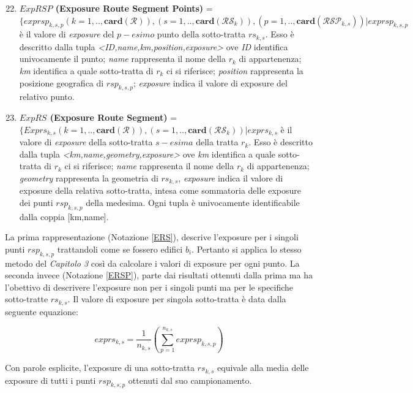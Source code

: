 \begin{enumerate}
\setcounter{enumi}{21}
\item \label{ERSP} \textbf{$ExpRSP$ (Exposure Route Segment Points)} =\\
$ \{exprsp_{k,s,p} (k=1,..,\mathbf{card}(\mathcal{R})),(s=1,..,\mathbf{card}(\mathcal{RS}_k)),(p=1,..,\mathbf{card}(\mathcal{RSP}_{k,s}))  | exprsp_{k,s,p} $ è il valore di \textit{exposure} del $p-esimo$ punto della sotto-tratta $rs_{k,s}$. Esso è descritto dalla tupla \textit{<ID,name,km,position,exposure>} ove \textit{ID} identifica univocamente il punto; \textit{name} rappresenta il nome della $r_k$ di appartenenza; \textit{km} identifica a quale sotto-tratta di $r_k$ ci si riferisce; \textit{position} rappresenta la posizione geografica di $rsp_{k,s,p}$; \textit{exposure} indica il valore di exposure del relativo punto.

\item \label{ERS} \textbf{$ExpRS$ (Exposure Route Segment)} =\\$ \{Exprs_{k,s} (k=1,..,\mathbf{card}(\mathcal{R})),(s=1,..,\mathbf{card}(\mathcal{RS}_k)) | exprs_{k,s} $ è il valore di \textit{exposure} della sotto-tratta $s-esima$ della tratta $r_k$. Esso è descritto dalla tupla \textit{<km,name,geometry,exposure>} ove \textit{km} identifica a quale sotto-tratta di $r_k$ ci si riferisce; \textit{name} rappresenta il nome della $r_k$ di appartenenza; \textit{geometry} rappresenta la geometria di $rs_{k,s}$, \textit{exposure} indica il valore di exposure della relativa sotto-tratta, intesa come sommatoria delle exposure dei punti $rsp_{k,s,p}$ della medesima. Ogni tupla è univocamente identificabile dalla coppia [km,name].

\end{enumerate}
\noindent La prima rappresentazione (Notazione \ref{ERS}), descrive l'exposure per i singoli punti $rsp_{k,s,p}$ trattandoli come se fossero edifici $b_i$. Pertanto si applica lo stesso metodo del \textit{Capitolo 3} così da calcolare i valori di exposure per ogni punto.
\bigbreak
\noindent La seconda invece (Notazione \ref{ERSP}), parte dai risultati ottenuti dalla prima ma ha l'obettivo di descrivere l'exposure non per i singoli punti ma per le specifiche sotto-tratte $rs_{k,s}$. Il valore di exposure per singola sotto-tratta è data dalla seguente equazione:

\begin{equation}\label{eq:exprs}
exprs_{k,s}=\frac{1}{n_{k,s}}\left(\sum_{p=1}^{n_{k,s}} exprsp_{k,s,p}\right)
\end{equation}


\noindent Con parole esplicite, l'exposure di una sotto-tratta $rs_{k,s}$ equivale alla media delle exposure di tutti i punti $rsp_{k,s,p}$ ottenuti dal suo campionamento.